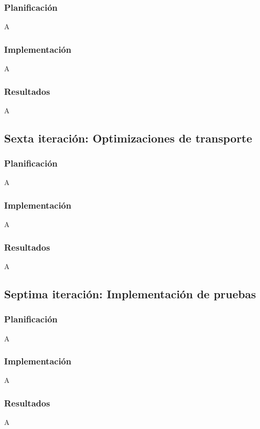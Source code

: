 \subsubsection*{Planificación}

A

\subsubsection*{Implementación}

A

\subsubsection*{Resultados}

A

\subsection{Sexta iteración: Optimizaciones de transporte}

\subsubsection*{Planificación}

A

\subsubsection*{Implementación}

A

\subsubsection*{Resultados}

A

\subsection{Septima iteración: Implementación de pruebas}

\subsubsection*{Planificación}

A

\subsubsection*{Implementación}

A

\subsubsection*{Resultados}

A

